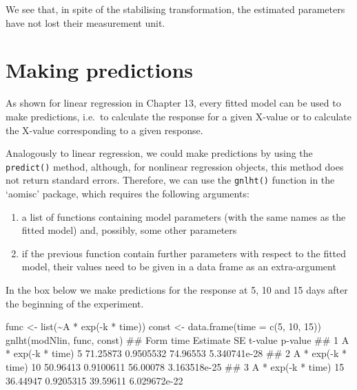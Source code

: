 \documentclass[a4paper,12pt,oneside]{book}
\providecommand{\tightlist}{%
  \setlength{\itemsep}{0pt}\setlength{\parskip}{0pt}}
\newenvironment{Shaded}{\begin{snugshade}}{\end{snugshade}}
\newcommand{\DecValTok}[1]{#1}
\newcommand{\SpecialCharTok}[1]{#1}
\newcommand{\DocumentationTok}[1]{#1}
\newcommand{\OtherTok}[1]{#1}
\newcommand{\FunctionTok}[1]{#1}
\newcommand{\AttributeTok}[1]{#1}
\newcommand{\NormalTok}[1]{#1}
\begin{document}
We see that, in spite of the stabilising transformation, the estimated parameters have not lost their measurement unit.

\hypertarget{making-predictions-1}{%
\section{Making predictions}\label{making-predictions-1}}

As shown for linear regression in Chapter 13, every fitted model can be used to make predictions, i.e.~to calculate the response for a given X-value or to calculate the X-value corresponding to a given response.

Analogously to linear regression, we could make predictions by using the \texttt{predict()} method, although, for nonlinear regression objects, this method does not return standard errors. Therefore, we can use the \texttt{gnlht()} function in the `aomisc' package, which requires the following arguments:

\begin{enumerate}
\def\labelenumi{\arabic{enumi}.}
\tightlist
\item
  a list of functions containing model parameters (with the same names as the fitted model) and, possibly, some other parameters
\item
  if the previous function contain further parameters with respect to the fitted model, their values need to be given in a data frame as an extra-argument
\end{enumerate}

In the box below we make predictions for the response at 5, 10 and 15 days after the beginning of the experiment.

\vspace{12pt}

\begin{Shaded}
\begin{Highlighting}[]
\NormalTok{func }\OtherTok{\textless{}{-}} \FunctionTok{list}\NormalTok{(}\SpecialCharTok{\textasciitilde{}}\NormalTok{A }\SpecialCharTok{*} \FunctionTok{exp}\NormalTok{(}\SpecialCharTok{{-}}\NormalTok{k }\SpecialCharTok{*}\NormalTok{ time))}
\NormalTok{const }\OtherTok{\textless{}{-}} \FunctionTok{data.frame}\NormalTok{(}\AttributeTok{time =} \FunctionTok{c}\NormalTok{(}\DecValTok{5}\NormalTok{, }\DecValTok{10}\NormalTok{, }\DecValTok{15}\NormalTok{)) }
\FunctionTok{gnlht}\NormalTok{(modNlin, func,  const)}
\DocumentationTok{\#\#                 Form time Estimate        SE  t{-}value      p{-}value}
\DocumentationTok{\#\# 1 A * exp({-}k * time)    5 71.25873 0.9505532 74.96553 5.340741e{-}28}
\DocumentationTok{\#\# 2 A * exp({-}k * time)   10 50.96413 0.9100611 56.00078 3.163518e{-}25}
\DocumentationTok{\#\# 3 A * exp({-}k * time)   15 36.44947 0.9205315 39.59611 6.029672e{-}22}
\end{Highlighting}
\end{Shaded}
\end{document}
